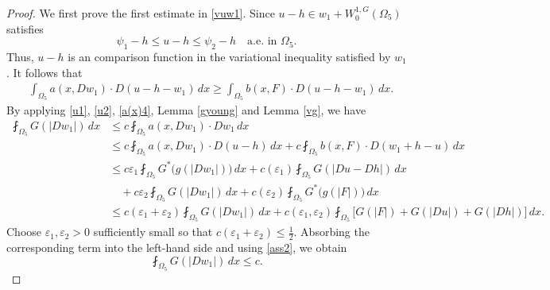 \documentclass[10pt,a4paper]{article}
\theoremstyle{definition}
\numberwithin{equation}{section}
\begin{document}
\begin{proof}
We first prove the first estimate in \eqref{vuw1}.
	Since $	u-h\in w_1+ W_0^{1,G}(\Omega_5)$ satisfies 
	\[
	\psi_1-h\leq u-h\leq\psi_2-h
	\quad\text{a.e. in }\Omega_5.
	\]
	Thus, $u-h$ is an comparison function in the variational inequality
	satisfied by $w_1$. It follows that
	\begin{align}\label{ineqw1}
		&\int_{\Omega_5}
		a(x,Dw_1)\cdot D(u-h-w_1)\,dx
		\geq
		\int_{\Omega_5}
		b(x,F)\cdot D(u-h-w_1)\,dx.
	\end{align}
By applying \eqref{u1}, \eqref{u2}, \eqref{a(x)4}, Lemma \ref{gyoung} 
 and Lemma \ref{vg}, we have
\begin{align*}
	\fint_{\Omega_5} G(|Dw_1|)\,dx
	&\leq c\fint_{\Omega_5}
	a(x,Dw_1)\cdot Dw_1\,dx
	\\
	&\leq	c\fint_{\Omega_5}	a(x,Dw_1)\cdot D(u-h)\,dx
+	c\fint_{\Omega_5}
	b(x,F)\cdot D(w_1+h-u)\,dx	\\
	&\leq	c\varepsilon_1	\fint_{\Omega_5}
	G^{*}\bigl(g(|Dw_1|)\bigr)\,dx+	c(\varepsilon_1)
	\fint_{\Omega_5}	G(|Du-Dh|)\,dx
	\\
	&\quad+
	c\varepsilon_2
	\fint_{\Omega_5}
	G(|Dw_1|)\,dx+	c(\varepsilon_2)
	\fint_{\Omega_5}
	G^{*}\bigl(g(|F|)\bigr)\,dx	\\
		&\leq	c(\varepsilon_1+\varepsilon_2)
	\fint_{\Omega_5}	G(|Dw_1|)\,dx	+
	c(\varepsilon_1,\varepsilon_2)
	\fint_{\Omega_5}
	\bigl[
	G(|F|)
	+
	G(|Du|)
	+
	G(|Dh|)
	\bigr]\,dx.
\end{align*}
	Choose $\varepsilon_1,\varepsilon_2>0$ sufficiently small so that
	$
	c(\varepsilon_1+\varepsilon_2)\leqslant \frac{1}{2}.
	$
	Absorbing the corresponding term into the left-hand side and using
	\eqref{ass2}, we obtain
	\[
	\fint_{\Omega_5} G(|Dw_1|)\,dx \leq c.
	\]



\end{proof}
\end{document}
